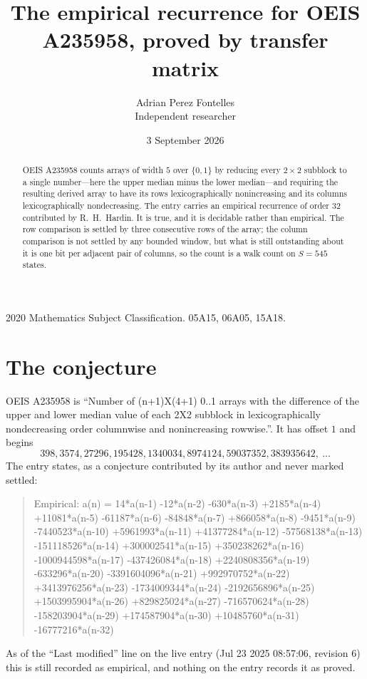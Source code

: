\documentclass[11pt,a4paper]{article}
\title{The empirical recurrence for OEIS A235958, proved by transfer matrix}
\author{Adrian Perez Fontelles\\ \small Independent researcher}
\date{3 September 2026}
\theoremstyle{plain}
\theoremstyle{definition}
\begin{document}
\maketitle

\begin{abstract}
OEIS A235958 counts arrays of width $5$ over $\{0,1\}$ by reducing every $2\times2$ subblock to a
single number---here the upper median minus the lower median---and requiring the resulting derived array to have its rows
lexicographically nonincreasing and its columns lexicographically nondecreasing. The entry carries an
empirical recurrence of order $32$ contributed by R.~H.~Hardin. It is true, and it is
decidable rather than empirical. The row comparison is settled by three consecutive rows of the
array; the column comparison is not settled by any bounded window, but what is still outstanding
about it is one bit per adjacent pair of columns, so the count is a walk count on $S=545$
states.
\end{abstract}

\noindent\small 2020 Mathematics Subject Classification. 05A15, 06A05, 15A18.\normalsize

\section{The conjecture}

OEIS A235958 is ``Number of (n+1)X(4+1) 0..1 arrays with the difference of the upper and lower median value of each 2X2 subblock in lexicographically nondecreasing order columnwise and nonincreasing rowwise.''. It has offset $1$ and begins
\[
398, 3574, 27296, 195428, 1340034, 8974124, 59037352, 383935642,\ \dots
\]
The entry states, as a conjecture contributed by its author and never marked settled:
\begin{quote}
Empirical: a(n) = 14*a(n-1) -12*a(n-2) -630*a(n-3) +2185*a(n-4) +11081*a(n-5) -61187*a(n-6) -84848*a(n-7) +866058*a(n-8) -9451*a(n-9) -7440523*a(n-10) +5961993*a(n-11) +41377284*a(n-12) -57568138*a(n-13) -151118526*a(n-14) +300002541*a(n-15) +350238262*a(n-16) -1000944598*a(n-17) -437426084*a(n-18) +2240808356*a(n-19) -633296*a(n-20) -3391604096*a(n-21) +992970752*a(n-22) +3413976256*a(n-23) -1734009344*a(n-24) -2192656896*a(n-25) +1503995904*a(n-26) +829825024*a(n-27) -716570624*a(n-28) -158203904*a(n-29) +174587904*a(n-30) +10485760*a(n-31) -16777216*a(n-32)
\end{quote}
As of the ``Last modified'' line on the live entry (Jul 23 2025 08:57:06, revision 6) this is still
recorded as empirical, and nothing on the entry records it as proved.
\end{document}
